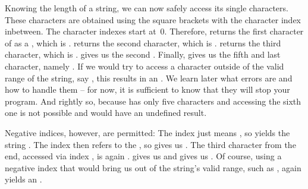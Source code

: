 Knowing the length of a string, we can now safely access its single characters.
These characters are obtained using the square brackets \pythonil{[]}\pythonIdx{[}\pythonIdx{]} with the character index inbetween.
The character indexes start at~0.
Therefore, \pythonIdx{[}\pythonIdx{]} returns the first character of  as a , which is \pythonIdx{\textquotedbl}.
 returns the second character, which is .
 returns the third character, which is .
\pythonIdx{[}\pythonIdx{]} gives us the second .
Finally,  gives us the fifth and last character, namely \pythonIdx{\textquotedbl}.
If we would try to access a character outside of the valid range of the string, say , this results in an .
We learn later what errors are and how to handle them -- for now, it is sufficient to know that they will stop your program.
And rightly so, because \pythonIdx{\textquotedbl} has only five characters and accessing the sixth one is not possible and would have an undefined result.

Negative indices, however, are permitted:
The index  just means , so  yields the string .
The index  then refers to the , so  gives us .
The third character from the end, accessed via index , is again .
 gives us  and  gives us .
Of course, using a negative index that would bring us out of the string's valid range, such as , again yields an .

